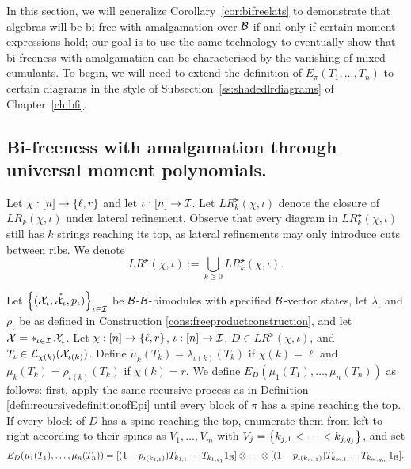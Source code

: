 		In this section, we will generalize Corollary~\ref{cor:bifreelats} to demonstrate that algebras will be bi-free with amalgamation over $\mathcal{B}$ if and only if certain moment expressions hold; our goal is to use the same technology to eventually show that bi-freeness with amalgamation can be characterised by the vanishing of mixed cumulants.
		To begin, we will need to extend the definition of $E_\pi(T_1,\ldots, T_n)$ to certain diagrams in the style of Subsection~\ref{ss:shadedlrdiagrams} of Chapter~\ref{ch:bfi}.


		\subsection{Bi-freeness with amalgamation through universal moment polynomials.}

		\begin{definition}
			Let $\chi : [n] \to \left\{\ell, r\right\}$ and let $\iota : [n] \to \mathcal{I}$.
			Let $LR^\lat_k(\chi, \iota)$ denote the closure of $LR_k(\chi, \iota)$ under lateral refinement.
			Observe that every diagram in $LR^\lat_k(\chi, \iota)$ still has $k$ strings reaching its top, as lateral refinements may only introduce cuts between ribs.
			We denote
			\[
				LR^\lat(\chi, \iota) := \bigcup_{k\geq 0} LR^\lat_k(\chi, \iota).
			\]
		\end{definition}









		\begin{definition}
			\label{defn:ELRrecursiveproof}
			Let $\left\{(\mathcal{X}_\iota, \mathring{\mathcal{X}}_\iota, p_\iota)\right\}_{\iota \in \mathcal{I}}$ be $\mathcal{B}$-$\mathcal{B}$-bimodules with specified $\mathcal{B}$-vector states, let $\lambda_\iota$ and $\rho_\iota$ be as defined in Construction \ref{cons:freeproductconstruction}, and let $\mathcal{X} = \mathop{\ast}_{\iota \in \mathcal{I}} \mathcal{X}_\iota$.
			Let $\chi : [n] \to \left\{\ell, r\right\}$, $\iota : [n] \to \mathcal{I}$, $D \in LR^\lat(\chi, \iota)$, and $T_\iota \in \mathcal{L}_{\chi(k)}(\mathcal{X}_{\iota(k)})$.
			Define $\mu_k(T_k) = \lambda_{\iota(k)}(T_k)$ if $\chi(k) = \ell$ and $\mu_k(T_k) = \rho_{\iota(k)}(T_k)$ if $\chi(k) = r$.
			We define $E_D(\mu_1(T_1),\ldots, \mu_n(T_n))$ as follows: first, apply the same recursive process as in Definition \ref{defn:recursivedefinitionofEpi} until every block of $\pi$ has a spine reaching the top.
			If every block of $D$ has a spine reaching the top, enumerate them from left to right according to their spines as $V_1,\ldots, V_m$ with $V_j=\left\{k_{j,1}<\cdots <k_{j,q_j}\right\}$, and set
			\[
				E_D(\mu_1(T_1),\ldots,\mu_n(T_n))=[(1-p_{\iota(k_{1,1})})T_{k_{1,1}} \cdots T_{k_{1,q_1}} 1_{\mathcal{B}}] \otimes \cdots \otimes [(1-p_{\iota(k_{m,1})})T_{k_{m,1}} \cdots T_{k_{m,q_m}} 1_{\mathcal{B}}].
			\]
		\end{definition}








